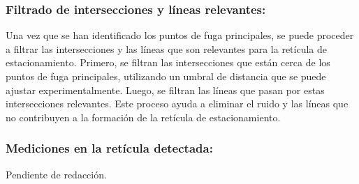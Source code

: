 \subsubsection{Filtrado de intersecciones y líneas relevantes:}
\noindent
Una vez que se han identificado los puntos de fuga principales, se puede proceder a filtrar las intersecciones y las líneas que son
relevantes para la retícula de estacionamiento.
Primero, se filtran las intersecciones que están cerca de los puntos de fuga principales, utilizando un umbral de distancia que se puede ajustar experimentalmente.
Luego, se filtran las líneas que pasan por estas intersecciones relevantes.
Este proceso ayuda a eliminar el ruido y las líneas que no contribuyen a la formación de la retícula de estacionamiento.


\subsubsection{Mediciones en la retícula detectada:}
Pendiente de redacción.
